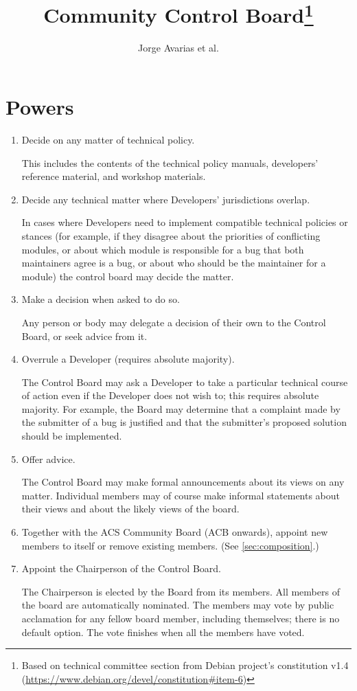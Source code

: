 \documentclass[]{article}
\title{Community Control Board\footnote{Based on technical committee section from Debian project's constitution v1.4 (\url{https://www.debian.org/devel/constitution\#item-6})}}
\author{Jorge Avarias et al.}
\begin{document}
\maketitle

\section{Powers}
\begin{enumerate}

\item Decide on any matter of technical policy.

    This includes the contents of the technical policy manuals, developers' reference material, 
    and workshop materials.

\item Decide any technical matter where Developers' jurisdictions overlap.

    In cases where Developers need to implement compatible technical policies or stances (for example, if they disagree about the priorities of conflicting modules, or about which module is responsible for a bug that both maintainers agree is a bug, or about who should be the maintainer for a module) the control board may decide the matter.

\item Make a decision when asked to do so.

    Any person or body may delegate a decision of their own to the Control Board, or seek advice from it.

\item Overrule a Developer (requires absolute majority).

    The Control Board may ask a Developer to take a particular technical course of action even if the Developer does not wish to; this requires absolute majority. For example, the Board may determine that a complaint made by the submitter of a bug is justified and that the submitter's proposed solution should be implemented.

\item Offer advice.

    The Control Board may make formal announcements about its views on any matter. Individual members may of course make informal statements about their views and about the likely views of the board.

\item Together with the ACS Community Board (ACB onwards), appoint new members to itself or remove existing members. (See \ref{sec:composition}.)

\item Appoint the Chairperson of the Control Board.

    The Chairperson is elected by the Board from its members. All members of the board are automatically nominated. The members may vote by public acclamation for any fellow board member, including themselves; there is no default option. The vote finishes when all the members have voted.

\end{enumerate}
\end{document}
